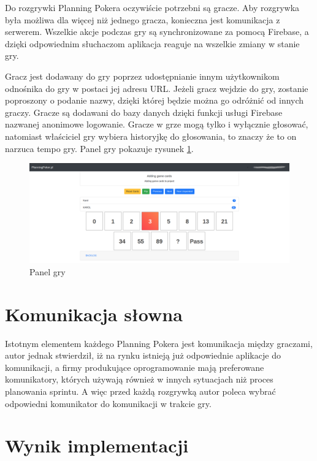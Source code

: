 Do rozgrywki Planning Pokera oczywiście potrzebni są gracze.
Aby rozgrywka była możliwa dla więcej niż jednego gracza, konieczna jest komunikacja z serwerem.
Wszelkie akcje podczas gry są synchronizowane za pomocą Firebase,
a dzięki odpowiednim słuchaczom aplikacja reaguje na wszelkie zmiany w stanie gry.

Gracz jest dodawany do gry poprzez udostępnianie innym użytkownikom odnośnika do gry
w postaci jej adresu URL.
Jeżeli gracz wejdzie do gry, zostanie poproszony o podanie nazwy,
dzięki której będzie można go odróżnić od innych graczy.
Gracze są dodawani do bazy danych dzięki funkcji usługi Firebase nazwanej anonimowe logowanie.
Gracze w grze mogą tylko i wyłącznie głosować,
natomiast właściciel gry wybiera historyjkę do głosowania, to znaczy że to on narzuca tempo gry.
Panel gry pokazuje rysunek \ref{rys:gra}.

\begin{figure}[H]
	\centering\includegraphics[width=\textwidth]{img/gra}
	\caption{Panel gry}\label{rys:gra}%
\end{figure}

\section{Komunikacja słowna}

Istotnym elementem każdego Planning Pokera jest komunikacja między graczami,
autor jednak stwierdził,
iż na rynku istnieją już odpowiednie aplikacje do komunikacji,
a firmy produkujące oprogramowanie mają preferowane komunikatory, których używają
również w innych sytuacjach niż proces planowania sprintu.
A więc przed każdą rozgrywką autor poleca wybrać odpowiedni komunikator do komunikacji w trakcie gry.


\section{Wynik implementacji}

